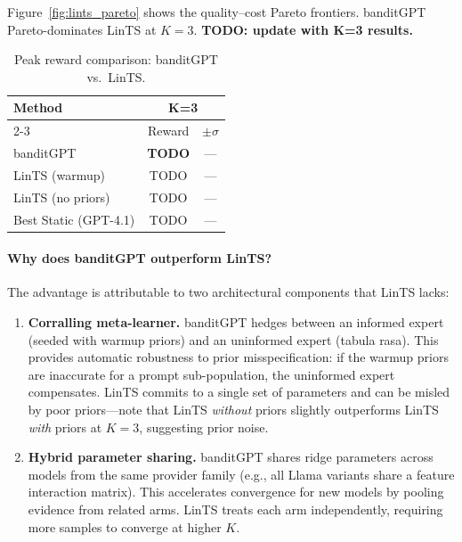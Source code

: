 

Figure~\ref{fig:lints_pareto} shows the quality--cost Pareto frontiers.
banditGPT Pareto-dominates LinTS at $K{=}3$. \textbf{TODO: update with K=3 results.}

\begin{table}[htbp]
\centering
\small
\caption{Peak reward comparison: banditGPT vs.\ LinTS.}
\label{tab:lints_peak}
\begin{tabular}{lcc}
\toprule
\textbf{Method} & \multicolumn{2}{c}{\textbf{K=3}} \\
\cmidrule(lr){2-3}
 & Reward & $\pm\sigma$ \\
\midrule
banditGPT           & \textbf{TODO} & --- \\
LinTS (warmup)      & TODO          & --- \\
LinTS (no priors)   & TODO          & --- \\
Best Static (GPT-4.1) & TODO       & ---   \\
\bottomrule
\end{tabular}
\end{table}

\paragraph{Why does banditGPT outperform LinTS?}
The advantage is attributable to two architectural components that LinTS lacks:

\begin{enumerate}[leftmargin=*,nosep]
  \item \textbf{Corralling meta-learner.}
        banditGPT hedges between an informed expert (seeded with warmup priors)
        and an uninformed expert (tabula rasa).  This provides automatic
        robustness to prior misspecification: if the warmup priors are
        inaccurate for a prompt sub-population, the uninformed expert
        compensates.  LinTS commits to a single set of parameters and can
        be misled by poor priors---note that LinTS \emph{without} priors
        slightly outperforms LinTS \emph{with} priors at $K{=}3$, suggesting
        prior noise.

  \item \textbf{Hybrid parameter sharing.}
        banditGPT shares ridge parameters across models from the same provider
        family (e.g., all Llama variants share a feature interaction matrix).
        This accelerates convergence for new models by pooling evidence from
        related arms.  LinTS treats each arm independently, requiring more
        samples to converge at higher $K$.
\end{enumerate}

